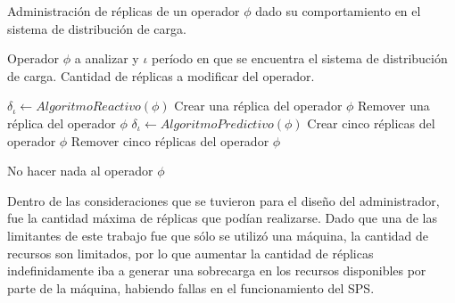 \begin{algorithm}[!hb]
	\caption{Administración de réplicas de un operador $\phi$ dado su comportamiento en el sistema de distribución de carga.}
	\label{alg:administracion}
	\begin{algorithmic}[1]
	\REQUIRE Operador $\phi$ a analizar y $\iota$ período en que se encuentra el sistema de distribución de carga.
	\ENSURE Cantidad de réplicas a modificar del operador.	
	
		\STATE $\delta_{\iota} \leftarrow AlgoritmoReactivo(\phi)$
				\RETURN Crear una réplica del operador $\phi$
			\ENDIF
			\RETURN Remover una réplica del operador $\phi$
		\ENDIF 
	\ELSE
		\STATE $\delta_{\iota} \leftarrow AlgoritmoPredictivo(\phi)$
				\RETURN Crear cinco réplicas del operador $\phi$
			\ENDIF
			\RETURN Remover cinco réplicas del operador $\phi$
		\ENDIF
	\ENDIF
	
	\RETURN No hacer nada al operador $\phi$
	
	\end{algorithmic}
\end{algorithm}

Dentro de las consideraciones que se tuvieron para el diseño del administrador, fue la cantidad máxima de réplicas que podían realizarse. Dado que una de las limitantes de este trabajo fue que sólo se utilizó una máquina, la cantidad de recursos son limitados, por lo que aumentar la cantidad de réplicas indefinidamente iba a generar una sobrecarga en los recursos disponibles por parte de la máquina, habiendo fallas en el funcionamiento del SPS.